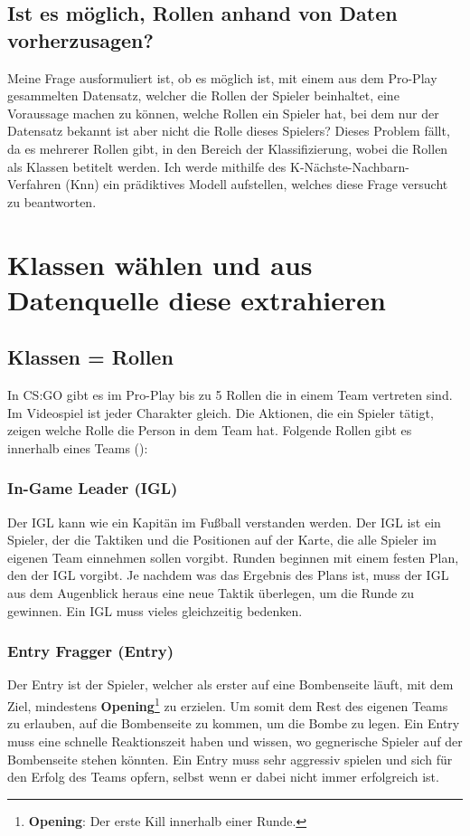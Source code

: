\documentclass[envcountsame, envcountchap, deutsch]{i-studis}
\begin{document}
\section{Ist es möglich, Rollen anhand von Daten vorherzusagen?}
Meine Frage ausformuliert ist, ob es möglich ist, mit einem aus dem Pro-Play gesammelten Datensatz, welcher die Rollen der Spieler beinhaltet, 
eine Voraussage machen zu können, welche Rollen ein Spieler hat, bei dem nur der Datensatz bekannt ist aber nicht die Rolle dieses Spielers?
Dieses Problem fällt, da es mehrerer Rollen gibt, in den Bereich der Klassifizierung, wobei die Rollen als Klassen betitelt werden. 
Ich werde mithilfe des K-Nächste-Nachbarn-Verfahren (Knn) ein prädiktives Modell aufstellen, welches diese Frage versucht zu beantworten.


\chapter{Klassen wählen und aus Datenquelle diese extrahieren}
\section{Klassen = Rollen}
In CS:GO gibt es im Pro-Play bis zu 5 Rollen die in einem Team vertreten sind. Im Videospiel ist jeder Charakter gleich. Die Aktionen, die 
ein Spieler tätigt, zeigen welche Rolle die Person in dem Team hat. Folgende Rollen gibt es innerhalb eines Teams (\cite{TV_2023}):
\subsection{In-Game Leader (IGL)}
Der IGL kann wie ein Kapitän im Fußball verstanden werden. 
Der IGL ist ein Spieler, der die Taktiken und die Positionen auf der Karte, die alle Spieler im eigenen Team einnehmen sollen vorgibt. 
Runden beginnen mit einem festen Plan, den der IGL vorgibt. Je nachdem was das Ergebnis des Plans ist, muss der IGL aus dem Augenblick heraus 
eine neue Taktik überlegen, um die Runde zu gewinnen. Ein IGL muss vieles gleichzeitig bedenken.
\subsection{Entry Fragger (Entry)}
Der Entry ist der Spieler, welcher als erster auf eine Bombenseite läuft, mit dem Ziel, mindestens \textbf{Opening}\footnote{\textbf{Opening}: Der erste Kill innerhalb einer Runde.} zu erzielen.
Um somit dem Rest des eigenen Teams zu erlauben, auf die Bombenseite zu kommen, um die Bombe zu legen. Ein Entry muss eine schnelle 
Reaktionszeit haben und wissen, wo gegnerische Spieler auf der Bombenseite stehen könnten.
Ein Entry muss sehr aggressiv spielen und sich für den Erfolg des Teams opfern, selbst wenn er dabei nicht immer erfolgreich ist.
\end{document}
